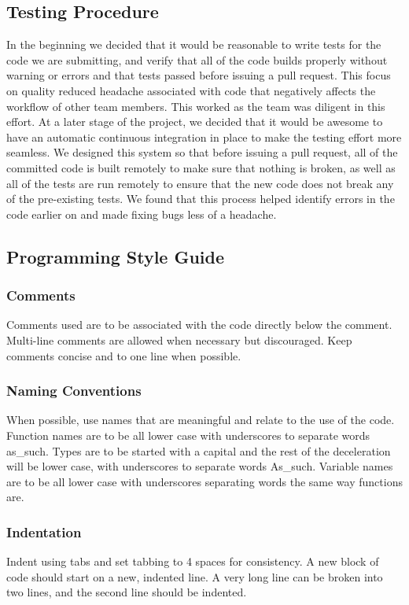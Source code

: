 \documentclass{article}
\begin{document}
\subsection{Testing Procedure}
In the beginning we decided that it would be reasonable to write tests for the code we are submitting, and verify that all of the code builds properly without warning or errors and that tests passed before issuing a pull request.  This focus on quality reduced headache associated with code that negatively affects the workflow of other team members.  This worked as the team was diligent in this effort.  At a later stage of the project, we decided that it would be awesome to have an automatic continuous integration in place to make the testing effort more seamless.  We designed this system so that before issuing a pull request, all of the committed code is built remotely to make sure that nothing is broken, as well as all of the tests are run remotely to ensure that the new code does not break any of the pre-existing tests.  We found that this process helped identify errors in the code earlier on and made fixing bugs less of a headache.
\subsection{Programming Style Guide}
\subsubsection{Comments}
Comments used are to be associated with the code directly below the comment.  Multi-line comments are allowed when necessary but discouraged.  Keep comments concise and to one line when possible.
\subsubsection{Naming Conventions}
When possible, use names that are meaningful and relate to the use of the code.  Function names are to be all lower case with underscores to separate words as\_such.  Types are to be started with a capital and the rest of the deceleration will be lower case, with underscores to separate words As\_such.  Variable names are to be all lower case with underscores separating words the same way functions are.
\subsubsection{Indentation}
Indent using tabs and set tabbing to 4 spaces for consistency.  A new block of code should start on a new, indented line.  A very long line can be broken into two lines, and the second line should be indented.
\end{document}
